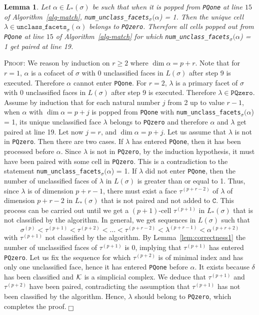 \documentclass[12pt]{article}
\newtheorem{lem}[thm]{Lemma}
\newenvironment{proof}{\noindent\textsc{Proof: }}{\hfill$\fbox{}$\par\medskip\par}
\newcommand{\cK}{{\cal K}}
\newcommand{\sC}{\texttt{C}} \newcommand{\sD}{\texttt{D}} \newcommand{\sM}{\texttt{M}} \newcommand{\sL}{\texttt{L}}
\begin{document}
\begin{lem}\label{lem:line19}
 Let $\alpha \in L_* (\sigma)$ be such that when it is popped from \texttt{PQone}
at line $15$ of Algorithm~\ref{alg-match}, \texttt{{num}\_{unclass}\_{facets}}$_{\sigma} (\alpha$) = 1. Then the unique cell
$\lambda \in \texttt{{unclass}\_{facets}}_{\sigma} (\alpha)$ belongs to \texttt{PQzero}. Therefore all cells popped out from \texttt{PQone} at line $15$ of Algorithm~\ref{alg-match} for which \texttt{{num}\_{unclass}\_{facets}}$_{\sigma} (\alpha$) = 1 get paired at line 19.
\end{lem}

\begin{proof}
We reason by induction on $r \geq 2$ where $\dim \alpha = p+r$. Note that for $r=1$, $\alpha$ is a cofacet of $\sigma$ with 0 unclassified faces in $L(\sigma)$ after step 9 is executed. Therefore $\alpha$ cannot enter \texttt{PQone}. For $r=2$, $\lambda$ is a primary facet of $\sigma$ with 0 unclassified faces in $L(\sigma)$ after step 9 is executed. Therefore $\lambda \in \texttt{PQzero}$. Assume by induction that for each natural number $j$ from 2 up to value $r-1$, when $\alpha$ with $\dim \alpha = p+ j$ is popped from \texttt{PQone} with \texttt{{num}\_{unclass}\_{facets}}$_{\sigma} (\alpha$) = 1, its unique unclassified face $\lambda$ belongs to \texttt{PQzero} and therefore $\alpha$ and $\lambda$ get paired at line 19. Let now $j=r$, and  $\dim\alpha=p+j$. Let us assume that $\lambda$ is not in \texttt{PQzero}. Then there are two cases. If $\lambda$ has entered \texttt{PQone}, then it has been processed before $\alpha$. Since $\lambda$ is not in \texttt{PQzero}, by the induction hypothesis, it must have been paired with some cell in \texttt{PQzero}. This is a contradiction to the statement \texttt{{num}\_{unclass}\_{facets}}$_{\sigma} (\alpha$) = 1. If $\lambda$ did not enter \texttt{PQone}, then the number of unclassified faces of $\lambda$ in $L(\sigma)$ is greater than or equal to 1. Thus, since $\lambda$ is of dimension $p+r-1$, there must exist a face $\tau^{(p+r-2)}$ of $\lambda$ of dimension $p+r-2$ in $L_* (\sigma)$ that is not paired and not added to $\sC$. This process can be carried out until we get a $(p+1)$-cell $\tau^{(p+1)}$ in $L_*(\sigma)$ that is not classified by the algorithm. In general, we get sequences in $L(\sigma)$ such that
$$\sigma^{(p)}<\tau^{(p+1)}<\tau^{(p+2)}<\ldots < \tau^{(p+r-2)}<\lambda ^{(p+r-1)} <\alpha^{(p+r+2)}$$ with $\tau^{(p+1)}$ not classified by the algorithm. By Lemma~\ref{lem:correctness1} the number of unclassified faces of $\tau^{(p+1)}$ is 0, implying that $\tau^{(p+1)}$ has entered \texttt{PQzero}. Let us fix the sequence for which $\tau^{(p+2)}$ is of minimal index and has only one unclassified face, hence it has entered \texttt{PQone} before $\alpha$. It exists because $\delta$ has been classified and $\cK$ is a simplicial complex.  We deduce that $\tau^{(p+1)}$  and  $\tau^{(p+2)}$ have been paired, contradicting the assumption that $\tau^{(p+1)}$ has not  been classified by the algorithm. Hence, $\lambda$ should belong to \texttt{PQzero}, which completes the proof.
\end{proof}
\end{document}
